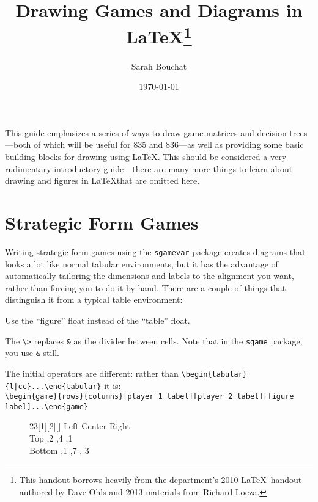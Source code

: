 \documentclass[10.5pt]{article}
\title{Drawing Games and Diagrams in \LaTeX \footnote{This handout borrows heavily from the department's 2010 \LaTeX~handout authored by Dave Ohls and 2013 materials from Richard Loeza.}}
\author{Sarah Bouchat}
\date{\today}
\begin{document}
\maketitle

This guide emphasizes a series of ways to draw game matrices and decision trees---both of which will be useful for 835 and 836---as well as providing some basic building blocks for drawing using \LaTeX. This should be considered a very rudimentary introductory guide---there are many more things to learn about drawing and figures in \LaTeX that are omitted here.\\


\section{Strategic Form Games}

Writing strategic form games using the \verb+sgamevar+ package creates diagrams that looks a lot like normal tabular environments, but it has the advantage of automatically tailoring the dimensions and labels to the alignment you want, rather than forcing you to do it by hand. There are a couple of things that distinguish it from a typical table environment:

\begin{compactitem}
\item Use the ``figure'' float instead of the ``table'' float.
\item The \verb+\>+ replaces \verb+&+ as the divider between cells. Note that in the \verb+sgame+ package, you use \verb+&+ still. 
\item The initial operators are different: rather than \verb+\begin{tabular}{l|cc}...\end{tabular}+ it is: \\ \verb+\begin{game}{rows}{columns}[player 1 label][player 2 label][figure label]...\end{game}+ \\
\end{compactitem}

\begin{figure}[h!]
\begin{center}
\begin{footnotesize}
\begin{game}{2}{3}[1][2][]
        \> Left \> Center \> Right   \\
Top      ,2  ,4    ,1   \\
Bottom    ,1  ,7    , 3 \\
\end{game}
\end{footnotesize}
\end{center}
\end{figure}
\end{document}

